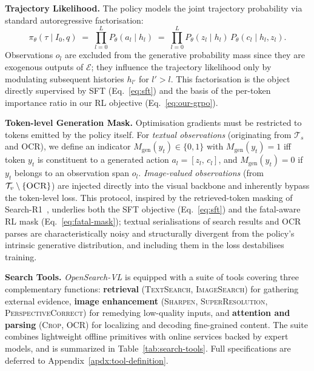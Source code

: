 \textbf{Trajectory Likelihood.}
The policy models the joint trajectory probability via standard autoregressive factorisation:
\begin{equation}
    \pi_\theta(\tau \mid I_0, q) \;=\; \prod_{l=0}^{L} P_\theta(a_l \mid h_l) \;=\; \prod_{l=0}^{L} P_\theta(z_l \mid h_l)\, P_\theta(c_l \mid h_l, z_l).
    \label{eq:traj-likelihood}
\end{equation}
Observations $o_l$ are excluded from the generative probability mass since they are exogenous outputs of $\mathcal{E}$; they influence the trajectory likelihood only by modulating subsequent histories $h_{l'}$ for $l' > l$. This factorisation is the object directly supervised by SFT (Eq.~\ref{eq:sft}) and the basis of the per-token importance ratio in our RL objective (Eq.~\ref{eq:our-grpo}).

\textbf{Token-level Generation Mask.}
Optimisation gradients must be restricted to tokens emitted by the policy itself. For \emph{textual observations} (originating from $\mathcal{T}_s$ and \textsc{OCR}), we define an indicator $M_{\text{gen}}(y_t)\in\{0,1\}$ with $M_{\text{gen}}(y_t)=1$ iff token $y_t$ is constituent to a generated action $a_l = [z_l,\, c_l]$, and $M_{\text{gen}}(y_t)=0$ if $y_t$ belongs to an observation span $o_l$. \emph{Image-valued observations} (from $\mathcal{T}_v\setminus\{\textsc{OCR}\}$) are injected directly into the visual backbone and inherently bypass the token-level loss. This protocol, inspired by the retrieved-token masking of Search-R1~\citep{jin2025searchr1trainingllmsreason}, underlies both the SFT objective (Eq.~\ref{eq:sft}) and the fatal-aware RL mask (Eq.~\ref{eq:fatal-mask}); textual serialisations of search results and OCR parses are characteristically noisy and structurally divergent from the policy's intrinsic generative distribution, and including them in the loss destabilises training.


\textbf{Search Tools.}
\emph{OpenSearch-VL} is equipped with a suite of tools covering three complementary functions: \textbf{retrieval} (\textsc{TextSearch}, \textsc{ImageSearch}) for gathering external evidence, \textbf{image enhancement} (\textsc{Sharpen}, \textsc{SuperResolution}, \textsc{PerspectiveCorrect}) for remedying low-quality inputs, and \textbf{attention and parsing} (\textsc{Crop}, \textsc{OCR}) for localizing and decoding fine-grained content. The suite combines lightweight offline primitives with online services backed by expert models, and is summarized in Table~\ref{tab:search-tools}. Full specifications are deferred to Appendix~\ref{apdx:tool-definition}.


